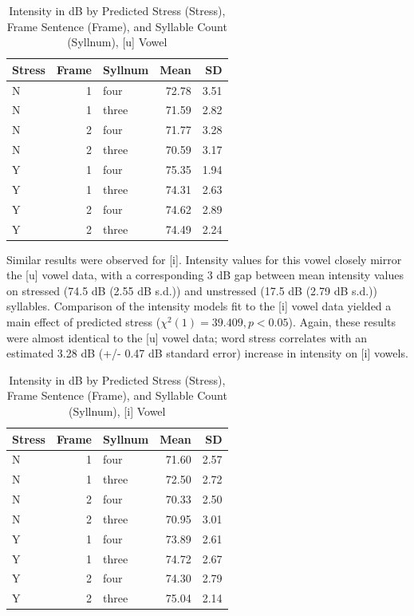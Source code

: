 \documentclass[english,man]{apa6}
\theoremstyle{definition}
\theoremstyle{definition}
\theoremstyle{definition}
\theoremstyle{remark}
\begin{document}
\begin{table}

\caption{\label{tab:Table3}Intensity in dB by Predicted Stress (Stress), Frame Sentence (Frame), and Syllable Count (Syllnum), [u] Vowel}
\centering
\begin{tabular}[t]{l|r|l|r|r}
\hline
Stress & Frame & Syllnum & Mean & SD\\
\hline
N & 1 & four & 72.78 & 3.51\\
\hline
N & 1 & three & 71.59 & 2.82\\
\hline
N & 2 & four & 71.77 & 3.28\\
\hline
N & 2 & three & 70.59 & 3.17\\
\hline
Y & 1 & four & 75.35 & 1.94\\
\hline
Y & 1 & three & 74.31 & 2.63\\
\hline
Y & 2 & four & 74.62 & 2.89\\
\hline
Y & 2 & three & 74.49 & 2.24\\
\hline
\end{tabular}
\end{table}

Similar results were observed for {[}i{]}. Intensity values for this
vowel closely mirror the {[}u{]} vowel data, with a corresponding 3 dB
gap between mean intensity values on stressed (74.5 dB (2.55 dB s.d.))
and unstressed (17.5 dB (2.79 dB s.d.)) syllables. Comparison of the
intensity models fit to the {[}i{]} vowel data yielded a main effect of
predicted stress (\(\chi^2(1) = 39.409, p < 0.05\)). Again, these
results were almost identical to the {[}u{]} vowel data; word stress
correlates with an estimated 3.28 dB (+/- 0.47 dB standard error)
increase in intensity on {[}i{]} vowels.

\begin{table}

\caption{\label{tab:Table4}Intensity in dB by Predicted Stress (Stress), Frame Sentence (Frame), and Syllable Count (Syllnum), [i] Vowel}
\centering
\begin{tabular}[t]{l|r|l|r|r}
\hline
Stress & Frame & Syllnum & Mean & SD\\
\hline
N & 1 & four & 71.60 & 2.57\\
\hline
N & 1 & three & 72.50 & 2.72\\
\hline
N & 2 & four & 70.33 & 2.50\\
\hline
N & 2 & three & 70.95 & 3.01\\
\hline
Y & 1 & four & 73.89 & 2.61\\
\hline
Y & 1 & three & 74.72 & 2.67\\
\hline
Y & 2 & four & 74.30 & 2.79\\
\hline
Y & 2 & three & 75.04 & 2.14\\
\hline
\end{tabular}
\end{table}
\end{document}
